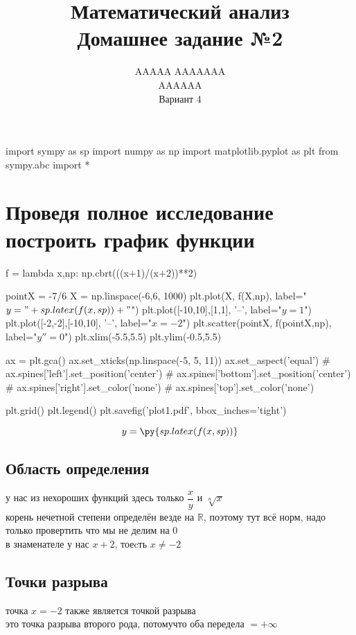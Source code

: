 \documentclass{article}
\title{Математический анализ \\ Домашнее задание №2}
\author{AAAAA AAAAAAA \\ AAAAAA \\ Вариант 4}
\begin{document}
  \maketitle

  \begin{pycode}
    import sympy as sp
    import numpy as np
    import matplotlib.pyplot as plt
    from sympy.abc import *
  \end{pycode}

  \section{Проведя полное исследование построить график функции}
  \begin{pycode}
    f = lambda x,np: np.cbrt(((x+1)/(x+2))**2)

    pointX = -7/6
    X = np.linspace(-6,6, 1000)
    plt.plot(X, f(X,np), label="$y="+sp.latex(f(x,sp))+"$")
    plt.plot([-10,10],[1,1], '--', label="$y=1$")
    plt.plot([-2,-2],[-10,10], '--', label="$x=-2$")
    plt.scatter(pointX, f(pointX,np), label="$y''=0$")
    plt.xlim(-5.5,5.5)
    plt.ylim(-0.5,5.5)

    ax = plt.gca()
    ax.set_xticks(np.linspace(-5, 5, 11))
    ax.set_aspect('equal')
    # ax.spines['left'].set_position('center')
    # ax.spines['bottom'].set_position('center')
    # ax.spines['right'].set_color('none')
    # ax.spines['top'].set_color('none')

    plt.grid()
    plt.legend()
    plt.savefig('plot1.pdf', bbox_inches='tight')
  \end{pycode}
  \[ y = \py{sp.latex(f(x,sp))} \]

  \subsection{Область определения}
  у нас из нехороших функций здесь только $\dfrac{x}{y}$ и $\sqrt[n]{x}$ \\
  корень нечетной степени определён везде на $\mathbb{R}$, поэтому тут всё норм, надо только провертить что мы не делим на 0 \\
  в знаменателе у нас $x+2$, тоеcть $x\not=-2$ \\

  \subsection{Точки разрыва}
  точка $x=-2$ также является точкой разрыва \\
  это точка разрыва второго рода, потомучто оба передела $=+\infty$
\end{document}
